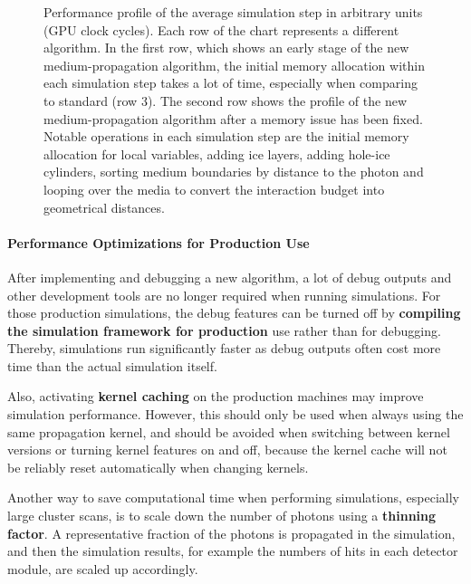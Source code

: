 
\begin{figure}[htbp]
  \caption{Performance profile of the average simulation step in arbitrary units (GPU clock cycles). Each row of the chart represents a different algorithm. In the first row, which shows an early stage of the new medium-propagation algorithm, the initial memory allocation within each simulation step takes a lot of time, especially when comparing to standard \clsim (row 3). The second row shows the profile of the new medium-propagation algorithm after a memory issue has been fixed. Notable operations in each simulation step are the initial memory allocation for local variables, adding ice layers, adding hole-ice cylinders, sorting medium boundaries by distance to the photon and looping over the media to convert the interaction budget into geometrical distances.}
  \label{fig:profiling-paz4Eig6}
\end{figure}


\paragraph{Performance Optimizations for Production Use}
After implementing and debugging a new algorithm, a lot of debug outputs and other development tools are no longer required when running simulations. For those production simulations, the debug features can be turned off by \textbf{compiling the \icecube simulation framework for production} use rather than for debugging. Thereby, simulations run significantly faster as debug outputs often cost more time than the actual simulation itself.

Also, activating \textbf{kernel caching} on the production machines may improve simulation performance. However, this should only be used when always using the same propagation kernel, and should be avoided when switching between kernel versions or turning kernel features on and off, because the kernel cache will not be reliably reset automatically when changing kernels.

\label{sec:thinning}
Another way to save computational time when performing simulations, especially large cluster scans, is to scale down the number of photons using a \textbf{thinning factor}. A representative fraction of the photons is propagated in the simulation, and then the simulation results, for example the numbers of hits in each detector module, are scaled up accordingly.

